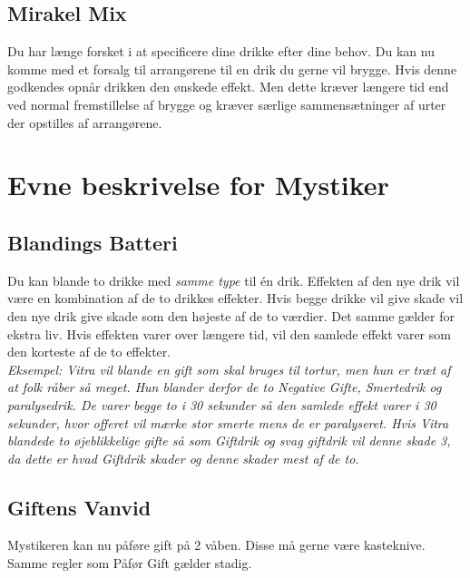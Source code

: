 

\subsection*{Mirakel Mix}
Du har længe forsket i at specificere dine drikke efter dine behov. Du kan nu komme med et forsalg til arrangørene til en drik du gerne vil brygge. Hvis denne godkendes opnår drikken den ønskede effekt. Men dette kræver længere tid end ved normal fremstillelse af brygge og kræver særlige sammensætninger af urter der opstilles af arrangørene.\\


\section{Evne beskrivelse for Mystiker}

\subsection{Blandings Batteri}
Du kan blande to drikke med \emph{samme type} til én drik. Effekten af den nye drik vil være en kombination af de to drikkes effekter. Hvis begge drikke vil give skade vil den nye drik give skade som den højeste af de to værdier. Det samme gælder for ekstra liv. Hvis effekten varer over længere tid, vil den samlede effekt varer som den korteste af de to effekter.\\
\textit{Eksempel: Vitra vil blande en gift som skal bruges til tortur, men hun er træt af at folk råber så meget. Hun blander derfor de to Negative Gifte, Smertedrik og paralysedrik. De varer begge to i 30 sekunder så den samlede effekt varer i 30 sekunder, hvor offeret vil mærke stor smerte mens de er paralyseret. Hvis Vitra blandede to øjeblikkelige gifte så som Giftdrik og svag giftdrik vil denne skade 3, da dette er hvad Giftdrik skader og denne skader mest af de to.}

\subsection{Giftens Vanvid}
Mystikeren kan nu påføre gift på 2 våben. Disse må gerne være kasteknive. Samme regler som Påfør Gift gælder stadig.\\

